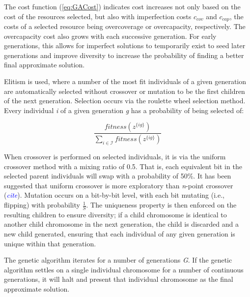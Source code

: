 \documentclass[onecolumn,draftcls]{IEEEtran}
\begin{document}

The cost function (\ref{eq:GACost}) indicates cost increases not only based on the cost of the resources selected, but also with imperfection costs $c_{cov}$ and $c_{cap}$, the costs of a selected resource being overcoverage or overcapacity, respectively.  The overcapacity cost also grows with each successive generation.  For early generations, this allows for imperfect solutions to temporarily exist to seed later generations and improve diversity to increase the probability of finding a better final approximate solution.  %

Elitism is used, where a number of the most fit individuals of a given generation are automatically selected without crossover or mutation to be the first children of the next generation.  Selection occurs via the roulette wheel selection method.  Every individual \textit{i} of a given generation \textit{g} has a probability of being selected of:


\[
\frac{fitness\left( z^{\{ig\}} \right)}{\sum_{i \in \mathcal{I}} fitness\left( z^{\{ig\}} \right)}
\]

When crossover is performed on selected individuals, it is via the uniform crossover method with a mixing ratio of 0.5.  That is, each equivalent bit in the selected parent individuals will swap with a probability of 50\%.  It has been suggested that uniform crossover is more exploratory than \textit{n}-point crossover (\textcolor{blue}{\textit{cite}}).  Mutation occurs on a bit-by-bit level, with each bit mutating (i.e., flipping) with probability $\frac{1}{S}$.  The uniqueness property is then enforced on the resulting children to ensure diversity; if a child chromosome is identical to another child chromosome in the next generation, the child is discarded and a new child generated, ensuring that each individual of any given generation is unique within that generation.

The genetic algorithm iterates for a number of generations \textit{G}.  If the genetic algorithm settles on a single individual chromosome for a number of continuous generations, it will halt and present that individual chromosome as the final approximate solution.
\end{document}
